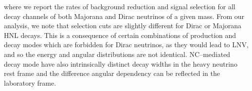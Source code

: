 where we report the rates of background reduction and signal selection for all decay channels of both Majorana and Dirac neutrinos of a given mass.
From our analysis, we note that selection cuts are slightly different for Dirac or Majorana HNL decays.
This is a consequence of certain combinations of production and decay modes which are forbidden for Dirac neutrinos, %
as they would lead to LNV, and so the energy and angular distributions are not identical.
NC--mediated decay mode have also intrinsically distinct decay widths in the heavy neutrino rest frame %
and the difference angular dependency can be reflected in the laboratory frame.



